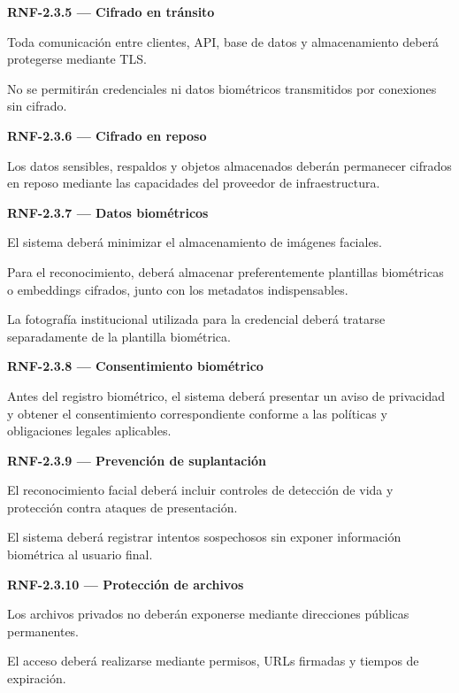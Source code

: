 \documentclass[12pt,a4paper]{article}
\newcommand{\RNF}[1]{\textbf{\color{secondary}RNF-#1}}
\newenvironment{requisito}[1]
{
\begin{center}
\begin{minipage}{0.96\textwidth}
\colorbox{requirement}{
\begin{minipage}{0.94\textwidth}
\textbf{#1}
\end{minipage}
}
\vspace{2mm}
}
{
\end{minipage}
\end{center}
}
\begin{document}
\begin{requisito}{\RNF{2.3.5} --- Cifrado en tránsito}
Toda comunicación entre clientes, API, base de datos y almacenamiento deberá
protegerse mediante TLS.

No se permitirán credenciales ni datos biométricos transmitidos por conexiones
sin cifrado.
\end{requisito}

\begin{requisito}{\RNF{2.3.6} --- Cifrado en reposo}
Los datos sensibles, respaldos y objetos almacenados deberán permanecer cifrados
en reposo mediante las capacidades del proveedor de infraestructura.
\end{requisito}

\begin{requisito}{\RNF{2.3.7} --- Datos biométricos}
El sistema deberá minimizar el almacenamiento de imágenes faciales.

Para el reconocimiento, deberá almacenar preferentemente plantillas biométricas
o embeddings cifrados, junto con los metadatos indispensables.

La fotografía institucional utilizada para la credencial deberá tratarse
separadamente de la plantilla biométrica.
\end{requisito}

\begin{requisito}{\RNF{2.3.8} --- Consentimiento biométrico}
Antes del registro biométrico, el sistema deberá presentar un aviso de privacidad
y obtener el consentimiento correspondiente conforme a las políticas y
obligaciones legales aplicables.
\end{requisito}

\begin{requisito}{\RNF{2.3.9} --- Prevención de suplantación}
El reconocimiento facial deberá incluir controles de detección de vida y
protección contra ataques de presentación.

El sistema deberá registrar intentos sospechosos sin exponer información
biométrica al usuario final.
\end{requisito}

\begin{requisito}{\RNF{2.3.10} --- Protección de archivos}
Los archivos privados no deberán exponerse mediante direcciones públicas
permanentes.

El acceso deberá realizarse mediante permisos, URLs firmadas y tiempos de
expiración.
\end{requisito}
\end{document}
